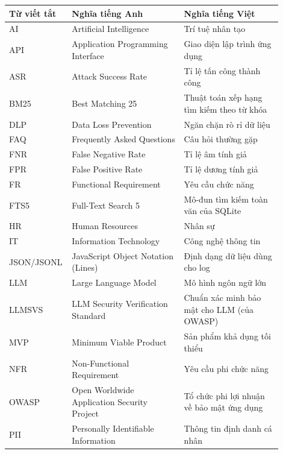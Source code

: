 \begin{longtable}{p{0.15\linewidth} >{\raggedright\arraybackslash}p{0.4\linewidth} >{\raggedright\arraybackslash}p{0.35\linewidth}}
\toprule
\bfseries Từ viết tắt & \bfseries Nghĩa tiếng Anh & \bfseries Nghĩa tiếng Việt \\
\midrule
\endhead
\bottomrule
\endfoot
AI & Artificial Intelligence & Trí tuệ nhân tạo \\
\addlinespace
API & Application Programming Interface & Giao diện lập trình ứng dụng \\
\addlinespace
ASR & Attack Success Rate & Tỉ lệ tấn công thành công \\
\addlinespace
BM25 & Best Matching 25 & Thuật toán xếp hạng tìm kiếm theo từ khóa \\
\addlinespace
DLP & Data Loss Prevention & Ngăn chặn rò rỉ dữ liệu \\
\addlinespace
FAQ & Frequently Asked Questions & Câu hỏi thường gặp \\
\addlinespace
FNR & False Negative Rate & Tỉ lệ âm tính giả \\
\addlinespace
FPR & False Positive Rate & Tỉ lệ dương tính giả \\
\addlinespace
FR & Functional Requirement & Yêu cầu chức năng \\
\addlinespace
FTS5 & Full-Text Search 5 & Mô-đun tìm kiếm toàn văn của SQLite \\
\addlinespace
HR & Human Resources & Nhân sự \\
\addlinespace
IT & Information Technology & Công nghệ thông tin \\
\addlinespace
JSON/JSONL & JavaScript Object Notation (Lines) & Định dạng dữ liệu dùng cho log \\
\addlinespace
LLM & Large Language Model & Mô hình ngôn ngữ lớn \\
\addlinespace
LLMSVS & LLM Security Verification Standard & Chuẩn xác minh bảo mật cho LLM (của OWASP) \\
\addlinespace
MVP & Minimum Viable Product & Sản phẩm khả dụng tối thiểu \\
\addlinespace
NFR & Non-Functional Requirement & Yêu cầu phi chức năng \\
\addlinespace
OWASP & Open Worldwide Application Security Project & Tổ chức phi lợi nhuận về bảo mật ứng dụng \\
\addlinespace
PII & Personally Identifiable Information & Thông tin định danh cá nhân \\

\end{longtable}

